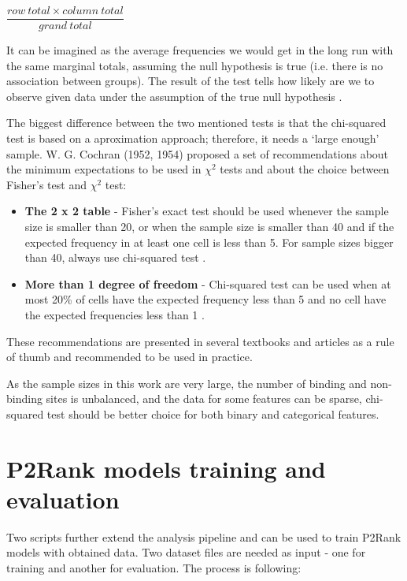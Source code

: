 \vspace{2mm}
\begin{center}
$\dfrac{row\: total\times column\:total}{grand\:total}$
\end{center}

It can be imagined as the average frequencies we would get in the long run with the same marginal totals, assuming the null hypothesis is true (i.e. there is no association between groups). The result of the test tells how likely are we to observe given data under the assumption of the true null hypothesis \cite{bland}.

The biggest difference between the two mentioned tests is that the chi-squared test is based on a aproximation approach; therefore, it needs a `large enough' sample. W. G. Cochran (1952, 1954) proposed a set of recommendations about the minimum expectations to be used in $\chi^{2}$ tests and about the choice between Fisher's test and $\chi^{2}$ test:

\begin{itemize}
\item \textbf{The 2 x 2 table} - Fisher's exact test should be used whenever the sample size is smaller than 20, or when the sample size is smaller than 40 and if the expected frequency in at least one cell is less than 5. For sample sizes bigger than 40, always use chi-squared test \cite{cochran1952, cochran}.
\item \textbf{More than 1 degree of freedom} - Chi-squared test can be used when at most 20\% of cells have the expected frequency less than 5 and no cell have the expected frequencies less than 1 \cite{cochran1954}.
\end{itemize}

 These recommendations are presented in several textbooks and articles as a rule of thumb \cite{cochranRule} and recommended to be used in practice.

As the sample sizes in this work are very large, the number of binding and non-binding sites is unbalanced, and the data for some features can be sparse, chi-squared test should be better choice for both binary and categorical features.


\section{P2Rank models training and evaluation}

Two scripts further extend the analysis pipeline and can be used to train P2Rank models with obtained data. Two dataset files are needed as input - one for training and another for evaluation. The process is following:

